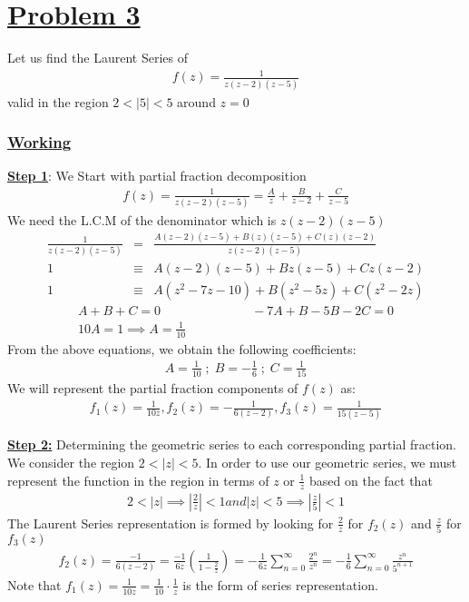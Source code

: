 \documentclass[12pt]{report}
\newcommand{\ubt}[1]{\textbf{\underline{#1}}}
\newcommand{\sps}{\\[0.2cm]}
\newcommand{\dsp}{\displaystyle}
\newcommand{\NI}{\noindent}
\newcommand{\problem}[1]{\section*{\ubt{Problem #1}}}
\newcommand{\working}{\subsubsection{\ubt{Working}}}
\begin{document}
	
	\problem{3}
	Let us find the Laurent Series of
	\begin{eqnarray*}
		f(z) = \frac{1}{z(z-2)(z-5)}
	\end{eqnarray*}
	valid in the region $2 < |5|<5$ around $z=0$
	
	\working
	\ubt{Step 1}: We Start with partial fraction decomposition
	\begin{eqnarray*}
		f(z) = \frac{1}{z(z-2)(z-5)} = \frac{A}{z}+ \frac{B}{z-2} + \frac{C}{z-5}
	\end{eqnarray*}
	We need the L.C.M of the denominator which is $z(z-2)(z-5)$
	\begin{eqnarray*}
		\frac{1}{z(z-2)(z-5)}  &=& \frac{A(z-2)(z-5)+B(z)(z-5)+C(z)(z-2)}{z(z-2)(z-5)}\sps
		1 &\equiv& A(z-2)(z-5)+Bz(z-5)+Cz(z-2)\sps
		1 &\equiv& A(z^2-7z-10) + B(z^2-5z) + C(z^2-2z)
	\end{eqnarray*}
	\begin{gather*}
		A+B+C= 0\hspace{3cm} -7A + B - 5B - 2C = 0\sps
		10A = 1 \implies A = \frac{1}{10}
	\end{gather*}
	From the above equations, we obtain the following coefficients:
	\begin{eqnarray*}
		A = \frac{1}{10}\; ; \; B =-\frac{1}{6}\; ; \; C =\frac{1}{15}
	\end{eqnarray*}
	We will represent the partial fraction components of $f(z)$ as:
	\begin{eqnarray*}
		f_1(z) = \frac{1}{10z}, f_2(z) = -\frac{1}{6(z-2)}, f_3(z) = \frac{1}{15(z-5)}
	\end{eqnarray*}
	
	\NI\ubt{Step 2:} Determining the geometric series to each corresponding partial fraction.\\
	
	\NI We consider the region $2<|z|<5$. In order to use our geometric series, we must represent the function in the region in terms of $z$ or $\dsp\frac{1}{z}$ based on the fact that
	\begin{eqnarray*}
		2 < |z| \implies \left|\frac{2}{z}\right| < 1 and |z| < 5 \implies\left|\frac{z}{5}\right| < 1
	\end{eqnarray*}
	The Laurent Series representation is formed by looking for $\dsp\frac{2}{z}$ for $f_2(z)$ and $\dsp\frac{z}{5}$ for $f_3(z)$
	\begin{eqnarray*}
		f_2(z) = \frac{-1}{6(z-2)} = \frac{-1}{6z}\left(\frac{1}{1-\frac{2}{z}}\right) = -\frac{1}{6z}\sum_{n=0}^{\infty}\frac{2^n}{z^n}=-\frac{1}{6}\sum_{n=0}^{\infty}\frac{z^n}{5^{n+1}}
	\end{eqnarray*}
	Note that $\dsp f_1(z)=\frac{1}{10z} = \frac{1}{10}\cdot \frac{1}{z}$ is the form of series representation.\\
	
\end{document}
